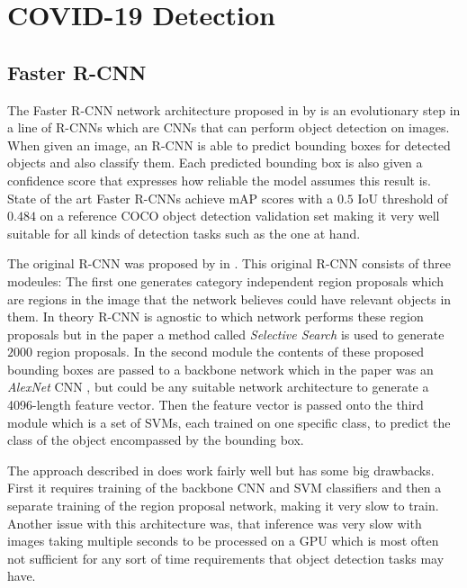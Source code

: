\chapter{COVID-19 Detection}\label{chapter:detection}


\section{Faster R-CNN}\label{chapter:rcnn}

The Faster \acf{R-CNN} network architecture proposed in \autocite{ren_faster_2016} by \citeauthor{ren_faster_2016} is an evolutionary step in a line of \acp{R-CNN} which are \acp{CNN} that can perform object detection on images. When given an image, an \ac{R-CNN} is able to predict bounding boxes for detected objects and also classify them. Each predicted bounding box is also given a confidence score that expresses how reliable the model assumes this result is. State of the art Faster \acp{R-CNN} achieve \ac{mAP} scores with a $0.5$ \ac{IoU} threshold of $0.484$ on a reference COCO object detection validation set making it very well suitable for all kinds of detection tasks such as the one at hand. 

The original \ac{R-CNN} was proposed by \citeauthor{girshick_rich_2014} in \autocite{girshick_rich_2014}. This original \ac{R-CNN} consists of three modeules: The first one generates category independent region proposals which are regions in the image that the network believes could have relevant objects in them. In theory \ac{R-CNN} is agnostic to which network performs these region proposals but in the paper a method called \textit{Selective Search} \autocite{uijlings_selective_2013} is used to generate $2000$ region proposals. In the second module the contents of these proposed bounding boxes are passed to a backbone network which in the paper was an \textit{AlexNet} CNN \autocite{krizhevsky_imagenet_2017}, but could be any suitable network architecture to generate a 4096-length feature vector. Then the feature vector is passed onto the third module which is a set of \acp{SVM}, each trained on one specific class, to predict the class of the object encompassed by the bounding box.

The approach described in \autocite{girshick_rich_2014} does work fairly well but has some big drawbacks. First it requires training of the backbone CNN and \ac{SVM} classifiers and then a separate training of the region proposal network, making it very slow to train. Another issue with this architecture was, that inference was very slow with images taking multiple seconds to be processed on a GPU which is most often not sufficient for any sort of time requirements that object detection tasks may have.

